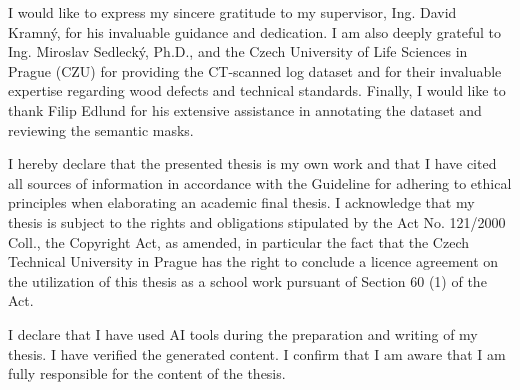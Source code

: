 \documentclass[english,bachelor,oneside]{ctufit-thesis}
\begin{document}
\frontmatter\frontmatterinit %

\thispagestyle{empty}\maketitle\thispagestyle{empty}\cleardoublepage %


\imprintpage %
\stopTOCentries

\begin{acknowledgmentpage}
	I would like to express my sincere gratitude to my supervisor, Ing. David Kramný, for his invaluable guidance and dedication. I am also deeply grateful to Ing. Miroslav Sedlecký, Ph.D., and the Czech University of Life Sciences in Prague (CZU) for providing the CT-scanned log dataset and for their invaluable expertise regarding wood defects and technical standards. Finally, I would like to thank Filip Edlund for his extensive assistance in annotating the dataset and reviewing the semantic masks.
\end{acknowledgmentpage}


\begin{declarationpage}
	I hereby declare that the presented thesis is my own work and that I have cited all sources of
    information in accordance with the Guideline for adhering to ethical principles when elaborating an
    academic final thesis.
    I acknowledge that my thesis is subject to the rights and obligations stipulated by the Act No.
    121/2000 Coll., the Copyright Act, as amended, in particular the fact that the Czech Technical
    University in Prague has the right to conclude a licence agreement on the utilization of this thesis as
    a school work pursuant of Section 60 (1) of the Act.

    I declare that I have used AI tools during the preparation and writing of my thesis. I have verified the generated content. I confirm that I am aware that I am fully responsible for the content of the thesis.
\end{declarationpage}

\printtwopageabstract
\end{document}
